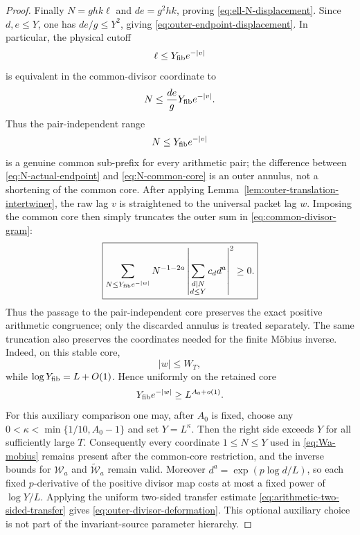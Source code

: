 \begin{proof}
Finally $N=ghk\ell$ and $de=g^2hk$, proving
\eqref{eq:ell-N-displacement}. Since $d,e\le Y$, one has
$de/g\le Y^2$, giving \eqref{eq:outer-endpoint-displacement}. In particular,
the physical cutoff
\[
\ell\le Y_{\rm fib}e^{-|v|}
\]
is equivalent in the common-divisor coordinate to
\begin{equation}
N\le \frac{de}{g}Y_{\rm fib}e^{-|v|}.
\label{eq:N-actual-endpoint}
\end{equation}
Thus the pair-independent range
\begin{equation}
N\le Y_{\rm fib}e^{-|v|}
\label{eq:N-common-core}
\end{equation}
is a genuine common sub-prefix for every arithmetic pair; the difference
between \eqref{eq:N-actual-endpoint} and \eqref{eq:N-common-core} is an outer
annulus, not a shortening of the common core. After applying
Lemma~\ref{lem:outer-translation-intertwiner}, the raw lag $v$ is straightened
to the universal packet lag $w$. Imposing the common core then simply truncates
the outer sum in \eqref{eq:common-divisor-gram}:
\begin{equation}
\boxed{
\sum_{N\le Y_{\rm fib}e^{-|w|}}
N^{-1-2a}
\left|\sum_{\substack{d\mid N\\d\le Y}}c_dd^a\right|^2\ge0.
}
\label{eq:common-core-positive-gram}
\end{equation}
Thus the passage to the pair-independent core preserves the exact positive
arithmetic congruence; only the discarded annulus is treated separately.
The same truncation also preserves the coordinates needed for the finite
M\"obius inverse. Indeed, on this stable core,
\[
|w|\le W_T,
\]
while $\log Y_{\rm fib}=L+O(1)$. Hence uniformly on the retained core
\begin{equation}
Y_{\rm fib}e^{-|w|}
\ge L^{A_0+o(1)}.
\label{eq:common-core-inverse-range}
\end{equation}
For this auxiliary comparison one may, after $A_0$ is fixed, choose any
$0<\kappa<\min\{1/10,A_0-1\}$ and set $Y=L^\kappa$. Then the right side exceeds
$Y$ for all sufficiently large $T$. Consequently every coordinate
$1\le N\le Y$ used in \eqref{eq:Wa-mobius} remains present after the common-core
restriction, and the inverse bounds for $\mathcal W_a$ and
$\widetilde{\mathcal W}_a$ remain valid. Moreover
$d^a=\exp(p\log d/L)$, so each fixed $p$-derivative of the positive divisor
map costs at most a fixed power of $\log Y/L$. Applying the uniform two-sided
transfer estimate \eqref{eq:arithmetic-two-sided-transfer} gives
\eqref{eq:outer-divisor-deformation}. This optional auxiliary choice is not part
of the invariant-source parameter hierarchy.
\end{proof}


